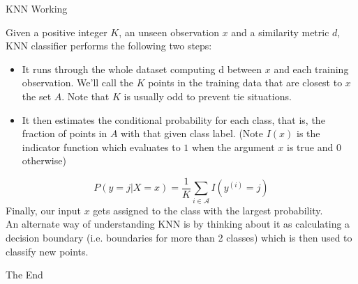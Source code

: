 \documentclass{beamer}
\begin{document}
\begin{frame}{KNN Working}
	\begin{flushleft}
		Given a positive integer $K$, an unseen observation $x$ and a similarity metric $d$, KNN classifier performs the following two steps:
\begin{itemize}
	\item It runs through the whole dataset computing d between $x$ and each training observation. We’ll call the $K$ points in the training data that are closest to $x$ the set $A$. Note that $K$ is usually odd to prevent tie situations.
	\item It then estimates the conditional probability for each class, that is, the fraction of points in $A$ with that given class label. (Note $I(x)$ is the indicator function which evaluates to $1$ when the argument $x$ is true and $0$ otherwise)
\end{itemize}
	\begin{equation*}
	P(y = j | X = x) = \frac{1}{K} \sum\limits_{i \in \mathcal{A}} I(y^{(i)} = j)
	\end{equation*}
	Finally, our input $x$ gets assigned to the class with the largest probability.\\
	An alternate way of understanding KNN is by thinking about it as calculating a decision boundary (i.e. boundaries for more than 2 classes) which is then used to classify new points.
\end{flushleft}
\end{frame}
\begin{frame}
\huge{\centerline{The End}}
\end{frame}
\end{document}
